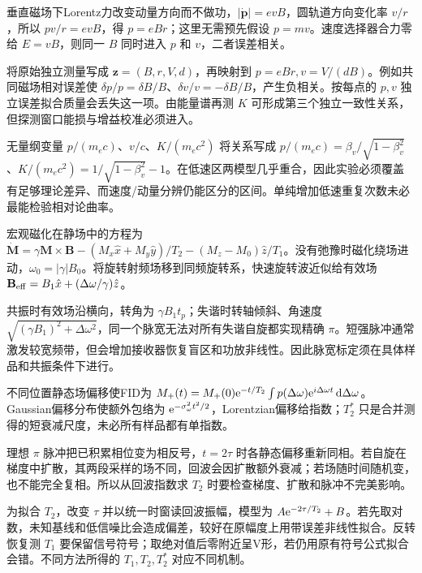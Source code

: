 垂直磁场下Lorentz力改变动量方向而不做功，$|\dot{\mathbf p}|=evB$，圆轨道方向变化率 $v/r$，所以 $pv/r=evB$，得 $p=eBr$；这里无需预先假设 $p=mv$。速度选择器合力零给 $E=vB$，则同一 $B$ 同时进入 $p$ 和 $v$，二者误差相关。

将原始独立测量写成 $\mathbf z=(B,r,V,d)$，再映射到 $p=eBr,v=V/(dB)$。例如共同磁场相对误差使 $\delta p/p=\delta B/B$、$\delta v/v=-\delta B/B$，产生负相关。按每点的 $p,v$ 独立误差拟合质量会丢失这一项。由能量谱再测 $K$ 可形成第三个独立一致性关系，但探测窗口能损与增益校准必须进入。

无量纲变量 $p/(m_ec)$、$v/c$、$K/(m_ec^2)$ 将关系写成 $p/(m_ec)=\beta_v/\sqrt{1-\beta_v^2}$、$K/(m_ec^2)=1/\sqrt{1-\beta_v^2}-1$。在低速区两模型几乎重合，因此实验必须覆盖有足够理论差异、而速度/动量分辨仍能区分的区间。单纯增加低速重复次数未必最能检验相对论曲率。

宏观磁化在静场中的方程为 $\dot{\mathbf M}=\gamma\mathbf M\times\mathbf B- (M_x\hat x+M_y\hat y)/T_2-(M_z-M_0)\hat z/T_1$。没有弛豫时磁化绕场进动，$\omega_0=|\gamma|B_0$。将旋转射频场移到同频旋转系，快速旋转波近似给有效场 $\mathbf B_{\rm eff}=B_1\hat x+(\Delta\omega/\gamma)\hat z$。

共振时有效场沿横向，转角为 $\gamma B_1t_p$；失谐时转轴倾斜、角速度 $\sqrt{(\gamma B_1)^2+\Delta\omega^2}$，同一个脉宽无法对所有失谐自旋都实现精确 $\pi$。短强脉冲通常激发较宽频带，但会增加接收器恢复盲区和功放非线性。因此脉宽标定须在具体样品和共振条件下进行。

不同位置静态场偏移使FID为 $M_+(t)=M_+(0)\mathrm e^{-t/T_2}\int p(\Delta\omega)\mathrm e^{i\Delta\omega t}\,\mathrm d\Delta\omega$。Gaussian偏移分布使额外包络为 $\mathrm e^{-\sigma_\omega^2t^2/2}$，Lorentzian偏移给指数；$T_2^*$ 只是合并测得的短衰减尺度，未必所有样品都有单指数。

理想 $\pi$ 脉冲把已积累相位变为相反号，$t=2\tau$ 时各静态偏移重新同相。若自旋在梯度中扩散，其两段采样的场不同，回波会因扩散额外衰减；若场随时间随机变，也不能完全复相。所以从回波指数求 $T_2$ 时要检查梯度、扩散和脉冲不完美影响。

为拟合 $T_2$，改变 $\tau$ 并以统一时窗读回波振幅，模型为 $A\mathrm e^{-2\tau/T_2}+B$。若先取对数，未知基线和低信噪比会造成偏差，较好在原幅度上用带误差非线性拟合。反转恢复测 $T_1$ 要保留信号符号；取绝对值后零附近呈V形，若仍用原有符号公式拟合会错。不同方法所得的 $T_1,T_2,T_2^*$ 对应不同机制。
